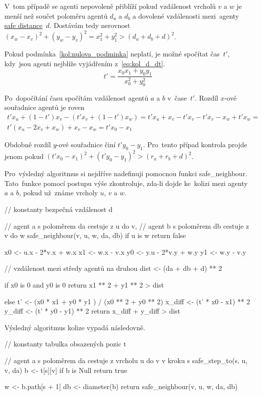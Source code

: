 V~tom případě se agenti nepovoleně přiblíží pokud vzdálenost vrcholů $v$ a $w$ je menší než
součet poloměru agentů $d_a$ a $d_b$ a dovolené vzdálenosti mezi~agenty \hyperref[par:safe_distance]{safe distance}~$d$.
Dostávám tedy nerovnost $(x_w - x_v)^2 + (y_w - y_v)^2 = x_1^2 + y_1^2 > (d_a + d_b + d)^2$.


Pokud podmínka~\ref{kol:nulova_podminka} neplatí, je možné spočítat čas~$t'$,
kdy~jsou agenti nejblíže vyjádřením z~\ref{eq:kol_d_dt}.
\begin{equation}
	\label{eq:kol_t}
	t' = \frac{x_0 x_1 + y_0 y_1}{x_0^2 + y_0^2}
\end{equation}

Po~dopočítání času spočítám vzdálenost agentů $a$ a $b$ v~čase~$t'$.
Rozdíl $x$-ové souřadnice agentů je roven
\begin{gather*}
	t' x_u + (1 - t')x_v - (t' x_v + (1 - t')x_w) =
	t' x_u + x_v - t' x_v - t' x_v - x_w + t' x_w = \\
	t'(x_u - 2x_v + x_w) + x_v - x_w =
	t' x_0 - x_1
\end{gather*}

Obdobně rozdíl $y$-ové souřadnice činí $t' y_0 - y_1$.
Pro~tento případ kontrola projde jenom pokud $(t' x_0 - x_1)^2 + (t' y_0 - y_1)^2 > (r_a + r_b + d)^2$.

Pro~výsledný algoritmus si nejdříve nadefinuji
pomocnou funkci \textrm{safe\_neighbour}.
Tato~funkce pomocí postupu výše zkontroluje, zda-li dojde ke~kolizi mezi agenty $a$ a $b$,
pokud už~známe vrcholy $u$, $v$ a $w$.
\begin{code}
// konstanty bezpečná vzdálenost d

// agent a s poloměrem da cestuje z u do v,
// agent b s poloměrem db cestuje z v do w
safe_neighbour(v, u, w, da, db)
if u is w return false

x0 <- u.x - 2*v.x + w.x
x1 <- w.x - v.x
y0 <- y.u - 2*v.y + w.y
y1 <- w.y - v.y

// vzdálenost mezi středy agentů na druhou
dist <- (da + db + d) ** 2

if x0 is 0 and y0 is 0
return x1 ** 2 + y1 ** 2 > dist

else
t' <- (x0 * x1 + y0 * y1 ) / (x0 ** 2 + y0 ** 2)
x_diff <- (t' * x0 - x1) ** 2
y_diff <- (t' * y0 - y1) ** 2
return x_diff + y_diff > dist
\end{code}
\label{alg:check_neighbour}

Výsledný algoritmus kolize vypadá následovně.
\begin{code}
// konstanty tabulka obsazených pozic t

// agent a s poloměrem da cestuje z vrcholu u do v v kroku s
safe_step_to(s, u, v, da)
b <- t[s][v]
if b is Null return true

w <- b.path[s + 1]
db <- diameter(b)
return safe_neighbour(v, u, w, da, db)
\end{code}

